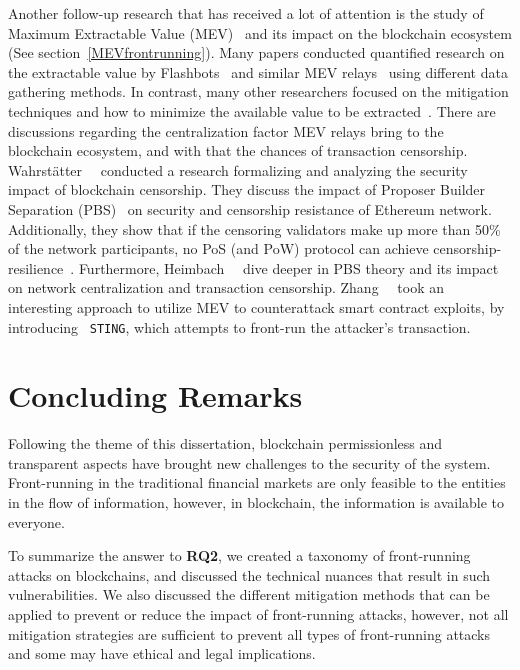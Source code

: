 Another follow-up research that has received a lot of attention is the study of Maximum Extractable Value (MEV)~\cite{flashboys} and its impact on the blockchain ecosystem (See section~\ref{MEVfrontrunning}). Many papers conducted quantified research on the extractable value by Flashbots~\cite{flashbotswebsite} and similar MEV relays~\cite{weintraub2022flash,li2023demystifying} using different data gathering methods. In contrast, many other researchers focused on the mitigation techniques and how to minimize the available value to be extracted~\cite{zhou2021a2mm,yang2022sok}. There are discussions regarding the centralization factor MEV relays bring to the blockchain ecosystem, and with that the chances of transaction censorship. Wahrstätter~\etal~\cite{wahrstatter2023blockchain} conducted a research formalizing and analyzing the security impact of blockchain censorship. They discuss the impact of Proposer Builder Separation (PBS)~\cite{ethereumPBS} on security and censorship resistance of Ethereum network. Additionally, they show that if the censoring validators make up more than 50\% of the network participants, no PoS (and PoW) protocol can achieve censorship-resilience~\cite{wahrstatter2023blockchain}. Furthermore, Heimbach~\etal~\cite{heimbach2023ethereum} dive deeper in PBS theory and its impact on network centralization and transaction censorship. Zhang~\etal~\cite{zhang2023your} took an interesting approach to utilize MEV to counterattack smart contract exploits, by introducing ~\texttt{STING}, which attempts to front-run the attacker's transaction.  




\section{Concluding Remarks} %

Following the theme of this dissertation, blockchain permissionless and transparent aspects have brought new challenges to the security of the system. Front-running in the traditional financial markets are only feasible to the entities in the flow of information, however, in blockchain, the information is available to everyone. 

To summarize the answer to \textbf{RQ2}, we created a taxonomy of front-running attacks on blockchains, and discussed the technical nuances that result in such vulnerabilities. We also discussed the different mitigation methods that can be applied to prevent or reduce the impact of front-running attacks, however, not all mitigation strategies are sufficient to prevent all types of front-running attacks and some may have ethical and legal implications.

